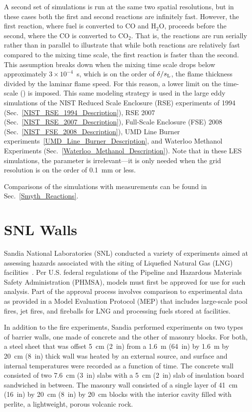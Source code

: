 A second set of simulations is run at the same two spatial resolutions, but in these cases both the first and second reactions are infinitely fast. However, the first reaction, where fuel is converted to CO and H$_2$O, proceeds before the second, where the CO is converted to CO$_2$. That is, the reactions are run serially rather than in parallel to illustrate that while both reactions are relatively fast compared to the mixing time scale, the first reaction is faster than the second. This assumption breaks down when the mixing time scale drops below approximately $3 \times 10^{-4}$~s, which is on the order of $\delta/s_{\rm L}$, the flame thickness divided by the laminar flame speed. For this reason, a lower limit on the time-scale () is imposed. This same modeling strategy is used in the large eddy simulations of the NIST Reduced Scale Enclosure (RSE) experiments of 1994 (Sec.~\ref{NIST_RSE_1994_Description}), RSE 2007 (Sec.~\ref{NIST_RSE_2007_Description}), Full-Scale Enclosure (FSE) 2008 (Sec.~\ref{NIST_FSE_2008_Description}), UMD Line Burner experiments~\ref{UMD_Line_Burner_Description}, and Waterloo Methanol Experiments (Sec.~\ref{Waterloo_Methanol_Description}). Note that in these LES simulations, the parameter  is irrelevant---it is only needed when the grid resolution is on the order of 0.1~mm or less.

Comparisons of the simulations with measurements can be found in Sec.~\ref{Smyth_Reactions}.



\section{SNL Walls}
\label{SNL_Walls_Description}

Sandia National Laboratories (SNL) conducted a variety of experiments aimed at assessing hazards associated with the siting of Liquefied Natural Gas (LNG) facilities~\cite{Luketa:11078}. Per U.S. federal regulations of the Pipeline and Hazardous Materials Safety Administration (PHMSA), models must first be approved for use for such analysis. Part of the approval process involves comparison to experimental data as provided in a Model Evaluation Protocol (MEP) that includes large-scale pool fires, jet fires, and fireballs for LNG and processing fuels stored at facilities.

In addition to the fire experiments, Sandia performed experiments on two types of barrier walls, one made of concrete and the other of masonry blocks. For both, a steel sheet that was offset 5~cm (2~in) from a 1.6~m (64~in) by 1.6~m by 20~cm (8~in) thick wall was heated by an external source, and surface and internal temperatures were recorded as a function of time. The concrete wall consisted of two 7.6~cm (3~in) slabs with a 5~cm (2~in) slab of insulation board sandwiched in between. The masonry wall consisted of a single layer of 41~cm (16~in) by 20~cm (8~in) by 20~cm blocks with the interior cavity filled with perlite, a lightweight, porous volcanic rock.

